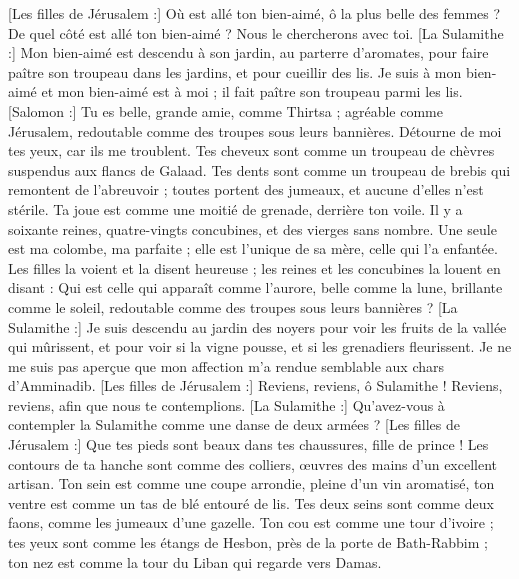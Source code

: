 \begin{multicols}{2}
\VerseOne{}[Les filles de Jérusalem :] Où est allé ton bien-aimé, ô la plus belle des femmes ? De quel côté est allé ton bien-aimé ? Nous le chercherons avec toi.
[La Sulamithe :] Mon bien-aimé est descendu à son jardin, au parterre d’aromates, pour faire paître son troupeau dans les jardins, et pour cueillir des lis.
Je suis à mon bien-aimé et mon bien-aimé est à moi ; il fait paître son troupeau parmi les lis.
[Salomon :] Tu es belle, grande amie, comme Thirtsa ; agréable comme Jérusalem, redoutable comme des troupes sous leurs bannières.
Détourne de moi tes yeux, car ils me troublent. Tes cheveux sont comme un troupeau de chèvres suspendus aux flancs de Galaad.
Tes dents sont comme un troupeau de brebis qui remontent de l’abreuvoir ; toutes portent des jumeaux, et aucune d'elles n'est stérile.
Ta joue est comme une moitié de grenade, derrière ton voile.
Il y a soixante reines, quatre-vingts concubines, et des vierges sans nombre.
Une seule est ma colombe, ma parfaite ; elle est l’unique de sa mère, celle qui l'a enfantée. Les filles la voient et la disent heureuse ; les reines et les concubines la louent en disant :
Qui est celle qui apparaît comme l’aurore, belle comme la lune, brillante comme le soleil, redoutable comme des troupes sous leurs bannières ?
[La Sulamithe :] Je suis descendu au jardin des noyers pour voir les fruits de la vallée qui mûrissent, et pour voir si la vigne pousse, et si les grenadiers fleurissent.
Je ne me suis pas aperçue que mon affection m'a rendue semblable aux chars d’Amminadib.
\VerseOne{}[Les filles de Jérusalem :] Reviens, reviens, ô Sulamithe ! Reviens, reviens, afin que nous te contemplions. [La Sulamithe :] Qu’avez-vous à contempler la Sulamithe comme une danse de deux armées ?
[Les filles de Jérusalem :] Que tes pieds sont beaux dans tes chaussures, fille de prince ! Les contours de ta hanche sont comme des colliers, œuvres des mains d'un excellent artisan.
Ton sein est comme une coupe arrondie, pleine d’un vin aromatisé, ton ventre est comme un tas de blé entouré de lis.
Tes deux seins sont comme deux faons, comme les jumeaux d'une gazelle.
Ton cou est comme une tour d'ivoire ; tes yeux sont comme les étangs de Hesbon, près de la porte de Bath-Rabbim ; ton nez est comme la tour du Liban qui regarde vers Damas.

\end{multicols}
